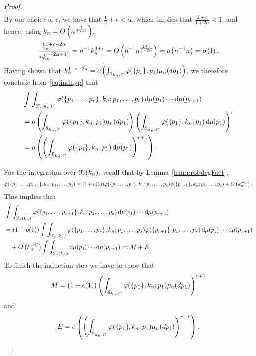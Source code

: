 \begin{proof}
\begin{align*}
\end{align*}
By our choice of $\epsilon$, we have that $\frac{1}{2}+\epsilon<\alpha$, which implies that $\frac{2+\epsilon}{1+2\alpha}<1$, and hence, using $k_n = O\left(n^{\frac{1}{2\alpha+1}}\right)$,
\begin{align*}
\frac{k_n^{1+\epsilon-2\alpha}}{nk_n^{-(2\alpha+1)}} = n^{-1} k_n^{2+\epsilon} = O\left(n^{-1} n^{\frac{2+\epsilon}{1+2\alpha}}\right) = o\left(n^{-1}n\right)= o\left(1\right).
\end{align*}
Having shown that $k_n^{1+\epsilon-2\alpha} = o\left(\int_{\mathcal{S}_{k_n,C}} \varphi(\{p_1\};p_1)\mu_n(dp_1)\right)$, we therefore conclude from~\eqref{eq:indhyp} that
\begin{align*}
	&\int \int_{\mathcal{F}_\epsilon(k_n)^c} \varphi(\{p_1,\dots,p_r\}, k_n ;p_1,\dots,p_s)
		\operatorname{\mathrm{d}\hspace{-2pt}} \mu(p_1) \cdots \operatorname{\mathrm{d}\hspace{-2pt}} \mu(p_{r+1})\\
	&=o\left(\int_{\mathcal{S}_{k_n,C}} \varphi(\{p_1\}, k_n ;p_1)\mu_n(dp_1)\right)
		\left(\int_{\mathcal{S}_{k_n,C}} \varphi(\{p_1\}, k_n ;p_1) \operatorname{\mathrm{d}\hspace{-2pt}} \mu(p_1) \right)^r  \\
	&=o\left(\left(\int_{\mathcal{S}_{k_n,C}} \varphi(\{p_1\}, k_n ;p_1) \operatorname{\mathrm{d}\hspace{-2pt}} \mu(p_1)\right)^{r+1}\right).
\end{align*}

For the integration over $\mathcal{F}_\epsilon(k_n)$, recall that by Lemma~\ref{lem:probdegFact}, \[
	\varphi(\{p_1,\dots,p_{r+1}\}, k_n ;p_1,\dots,p_s)
	=(1+o(1))\varphi(\{p_1,\dots,p_r\}, k_n ;p_1,\dots,p_s)
	\varphi(\{p_{r+1}\}, k_n ;p_1,\dots,p_s)+O\left(k_n^{-C}\right).
\]
This implies that
\begin{align*}
	&\int \int_{\mathcal{F}_\epsilon(k_n)} \varphi(\{p_1,\dots,p_{r+1}\}, k_n ;p_1,\dots,p_s) 
		 \operatorname{\mathrm{d}\hspace{-2pt}} \mu(p_1) \cdots \operatorname{\mathrm{d}\hspace{-2pt}} \mu(p_{r+1})\\
	&=(1+o(1))\int \int_{\mathcal{F}_\epsilon(k_n)} \varphi(\{p_1,\dots,p_r\}, k_n ;p_1,\dots,p_s) 
		\varphi(\{p_{r+1}\};p_1,\dots,p_s) \operatorname{\mathrm{d}\hspace{-2pt}} \mu(p_1) \cdots \operatorname{\mathrm{d}\hspace{-2pt}} \mu(p_{r+1}) \\
	&\hspace{10pt}+O\left(k_n^{-C}\right)\int \int_{\mathcal{F}_\epsilon(k_n)} 
		\operatorname{\mathrm{d}\hspace{-2pt}} \mu(p_1) \cdots \operatorname{\mathrm{d}\hspace{-2pt}} \mu(p_{r+1}) =:M+E.
\end{align*}
To finish the induction step we have to show that
\begin{align*}
M=(1+o(1)) \left(\int_{\mathcal{S}_{k_n,C}} \varphi(\{p_1\}, k_n ;p_1)\mu_n(dp_1)\right)^{r+1}
\end{align*}
and
\begin{align*}
E=o\left(\left(\int_{\mathcal{S}_{k_n,C}} \varphi(\{p_1\}, k_n ;p_1)\mu_n(dp_1)\right)^{r+1}\right).
\end{align*}


\end{proof}
